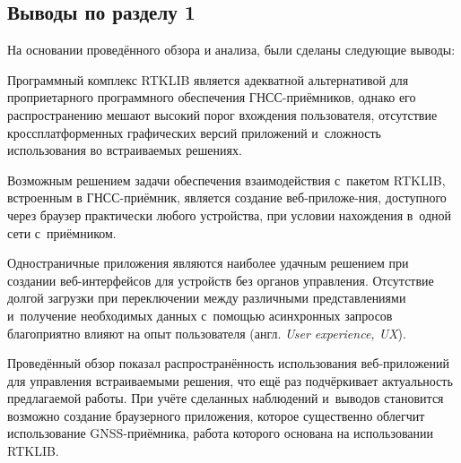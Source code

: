 \subsection{Выводы по разделу 1}
\label{subsec:section1-conclusions}

На основании проведённого обзора и анализа, были сделаны следующие выводы:

\begin{dashitemize}
  \item Программный комплекс RTKLIB является адекватной альтернативой для проприетарного программного обеспечения ГНСС-приёмников, однако его распространению мешают высокий порог вхождения пользователя, отсутствие кроссплатформенных графических версий приложений и~сложность использования во встраиваемых решениях.
  \item Возможным решением задачи обеспечения взаимодействия с~пакетом RTKLIB, встроенным в ГНСС-приёмник, является создание веб-приложе-ния, доступного через браузер практически любого устройства, при условии нахождения в~одной сети с~приёмником.
  \item Одностраничные приложения являются наиболее удачным решением при создании веб-интерфейсов для устройств без органов управления. Отсутствие долгой загрузки при переключении между различными представлениями и~получение необходимых данных с~помощью асинхронных запросов благоприятно влияют на опыт пользователя (англ. \emph{User experience, UX}).
\end{dashitemize}

Проведённый обзор показал распространённость использования веб-приложений для управления встраиваемыми решения, что ещё раз подчёркивает актуальность предлагаемой работы. При учёте сделанных наблюдений и~выводов становится возможно создание браузерного приложения, которое существенно облегчит использование GNSS-приёмника, работа которого основана на использовании RTKLIB.

\newpage
